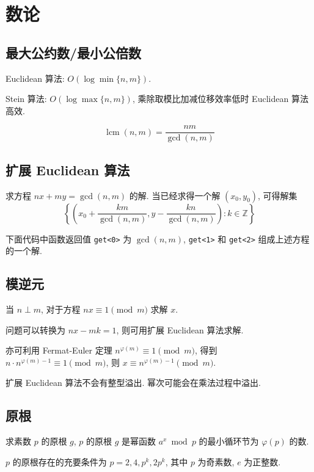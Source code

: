 \clearpage
\section{数论}

\subsection{最大公约数/最小公倍数}
Euclidean 算法: $O(\log\min\{n,m\})$.

Stein 算法: $O(\log\max\{n,m\})$, 乘除取模比加减位移效率低时 Euclidean 算法高效.

\[\operatorname{lcm}(n,m)=\frac{nm}{\gcd(n,m)}\]



\subsection{扩展 Euclidean 算法}

求方程 $nx+my=\gcd(n,m)$ 的解. 当已经求得一个解 $(x_0,y_0)$, 可得解集 \[\left\{\left(x_0+\frac{km}{\gcd(n,m)},y-\frac{kn}{\gcd(n,m)}\right):k\in\mathbb Z\right\}\]

下面代码中函数返回值 \lstinline{get<0>} 为 $\gcd(n,m)$, \lstinline{get<1>} 和 \lstinline{get<2>} 组成上述方程的一个解.



\subsection{模逆元}

当 $n\perp m$, 对于方程 $nx\equiv1\pmod m$ 求解 $x$.

问题可以转换为 $nx-mk=1$, 则可用扩展 Euclidean 算法求解.

亦可利用 Fermat-Euler 定理 $n^{\varphi(m)}\equiv1\pmod m$, 得到 $n\cdot n^{\varphi(m)-1}\equiv1\pmod m$, 则 $x\equiv n^{\varphi(m)-1}\pmod m$.

扩展 Euclidean 算法不会有整型溢出. 幂次可能会在乘法过程中溢出.



\subsection{原根}
求素数 $p$ 的原根 $g$, $p$ 的原根 $g$ 是幂函数 $a^x\bmod p$ 的最小循环节为 $\varphi(p)$ 的数.

$p$ 的原根存在的充要条件为 $p=2,4,p^k,2p^k$, 其中 $p$ 为奇素数, $e$ 为正整数.

